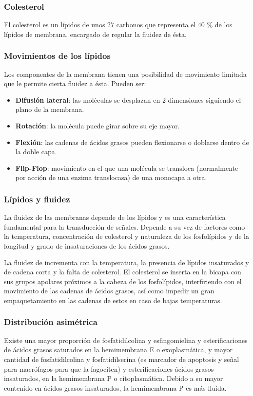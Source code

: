 \subsubsection{Colesterol}
El colesterol es un lípidos de unos 27 carbonos que representa el 40 \% de los lípidos de membrana, encargado de regular la fluidez de ésta.
\subsubsection{Movimientos de los lípidos}
Los componentes de la membrana tienen una posibilidad de movimiento limitada que le permite cierta fluidez a ésta. Pueden ser:
\begin{itemize}[itemsep=0pt,parsep=0pt,topsep=0pt,partopsep=0pt]
    \item \textbf{Difusión lateral}: las moléculas se desplazan en 2 dimensiones siguiendo el plano de la membrana.
    \item\textbf{Rotación}: la molécula puede girar sobre su eje mayor.
    \item\textbf{Flexión}: las cadenas de ácidos grasos pueden flexionarse o doblarse dentro de la doble capa.
    \item\textbf{Flip-Flop}: movimiento en el que una molécula se transloca (normalmente por acción de una enzima translocasa) de una monocapa a otra.
\end{itemize}
\subsubsection{Lípidos y fluidez}
La fluidez de las membranas depende de los lípidos y es una característica fundamental para la transducción de señales. Depende a su vez de factores como la temperatura, concentración de colesterol y naturaleza de los fosfolípidos y de la longitud y grado de insaturaciones de los ácidos grasos.

La fluidez de incrementa con la temperatura, la presencia de lípidos insaturados y de cadena corta y la falta de colesterol. El colesterol se inserta en la bicapa con sus grupos apolares próximos a la cabeza de los fosfolípidos, interfiriendo con el movimiento de las cadenas de ácidos grasos, así como impedir un gran empaquetamiento en las cadenas de estos en caso de bajas temperaturas.
\subsubsection{Distribución asimétrica}
Existe una mayor proporción de fosfatidilcolina y esfingomielina y esterificaciones de ácidos grasos saturados en la hemimembrana E o exoplasmática, y mayor cantidad de fosfatidilcolina y fosfatidilserina (es marcador de apoptosis y señal para macrófagos para que la fagociten) y esterificaciones ácidos grasos insaturados, en la hemimembrana P o citoplasmática. Debido a su mayor contenido en ácidos grasos insaturados, la hemimembrana P es más fluida.

